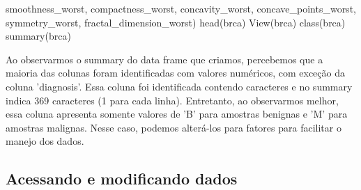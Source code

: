 \documentclass[
]{book}
\newenvironment{Shaded}{\begin{snugshade}}{\end{snugshade}}
\newcommand{\CommentTok}[1]{\textcolor[rgb]{0.56,0.35,0.01}{\textit{#1}}}
\newcommand{\FunctionTok}[1]{\textcolor[rgb]{0.00,0.00,0.00}{#1}}
\newcommand{\NormalTok}[1]{#1}
\newcommand{\OtherTok}[1]{\textcolor[rgb]{0.56,0.35,0.01}{#1}}
\newcommand{\SpecialCharTok}[1]{\textcolor[rgb]{0.00,0.00,0.00}{#1}}
\newcommand{\StringTok}[1]{\textcolor[rgb]{0.31,0.60,0.02}{#1}}
\begin{document}
\begin{Shaded}
\begin{Highlighting}[]
                    \StringTok{\textquotesingle{}smoothness\_worst\textquotesingle{}}\NormalTok{, }\StringTok{\textquotesingle{}compactness\_worst\textquotesingle{}}\NormalTok{,}
                    \StringTok{\textquotesingle{}concavity\_worst\textquotesingle{}}\NormalTok{, }\StringTok{\textquotesingle{}concave\_points\_worst\textquotesingle{}}\NormalTok{,}
                    \StringTok{\textquotesingle{}symmetry\_worst\textquotesingle{}}\NormalTok{, }\StringTok{\textquotesingle{}fractal\_dimension\_worst\textquotesingle{}}\NormalTok{)}
\FunctionTok{head}\NormalTok{(brca)}
\FunctionTok{View}\NormalTok{(brca)}
\FunctionTok{class}\NormalTok{(brca)}
\FunctionTok{summary}\NormalTok{(brca)}
\end{Highlighting}
\end{Shaded}

Ao observarmos o summary do data frame que criamos, percebemos que a maioria das colunas foram identificadas com valores numéricos, com exceção da coluna 'diagnosis'. Essa coluna foi identificada contendo caracteres e no summary indica 369 caracteres (1 para cada linha). Entretanto, ao observarmos melhor, essa coluna apresenta somente valores de 'B' para amostras benignas e 'M' para amostras malignas. Nesse caso, podemos alterá-los para fatores para facilitar o manejo dos
dados.

\begin{Shaded}
\end{Shaded}

\hypertarget{acessando-e-modificando-dados}{%
\subsection{Acessando e modificando dados}\label{acessando-e-modificando-dados}}
\end{document}
